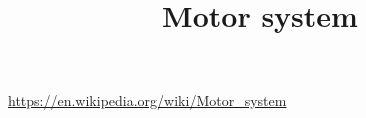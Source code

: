 \documentclass[a4paper]{article}
\title{Motor system}
\date{}
\begin{document}
    \maketitle
    \url{https://en.wikipedia.org/wiki/Motor_system}
\end{document}
